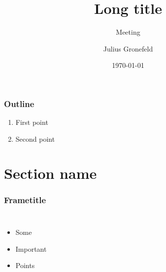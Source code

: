 
\author[J. Gronefeld]{Julius Gronefeld } %
\title[Short title]{Long title}
\subtitle[ | Meeting]{Meeting}
\date{\today}

{
\begin{frame}[t,plain]
\titlepage

\end{frame}
}


\begin{frame}
\frametitle{Outline}
\begin{enumerate}
	\item First point
	\item Second point
\end{enumerate}
\end{frame}

\section{Section name}
\begin{frame}
\frametitle{Frametitle}

\begin{columns}[t]
	\begin{itemize}
		\item Some 
		\item Important
		\item Points
	\end{itemize}
\end{columns}
\end{frame}	

